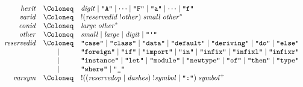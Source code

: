 \begin{align*}
\begin{array}{rcl}
    \\
    \mathit{hexit}
    & \Coloneq & \mathit{digit}
    \mid \text{\texttt{\textquotedbl A\textquotedbl}} \mid \cdots \mid \text{\texttt{\textquotedbl F\textquotedbl}}
    \mid \text{\texttt{\textquotedbl a\textquotedbl}} \mid \cdots \mid \text{\texttt{\textquotedbl f\textquotedbl}}
    \\
    \mathit{varid}
    & \Coloneq & ! (\mathit{reservedid}\; !\mathit{other})\; \mathit{small}\; \mathit{other}^*
    \\
    \mathit{conid}
    & \Coloneq & \mathit{large}\; \mathit{other}^*
    \\
    \mathit{other}
    & \Coloneq & \mathit{small}
    \mid \mathit{large}
    \mid \mathit{digit}
    \mid \text{\texttt{\textquotedbl\textquotesingle\textquotedbl}}
    \\
    \mathit{reservedid}
    & \Coloneq & \text{\texttt{\textquotedbl case\textquotedbl}}
    \mid \text{\texttt{\textquotedbl class\textquotedbl}}
    \mid \text{\texttt{\textquotedbl data\textquotedbl}}
    \mid \text{\texttt{\textquotedbl default\textquotedbl}}
    \mid \text{\texttt{\textquotedbl deriving\textquotedbl}}
    \mid \text{\texttt{\textquotedbl do\textquotedbl}}
    \mid \text{\texttt{\textquotedbl else\textquotedbl}}
    \\
    & \mid & \text{\texttt{\textquotedbl foreign\textquotedbl}}
    \mid \text{\texttt{\textquotedbl if\textquotedbl}}
    \mid \text{\texttt{\textquotedbl import\textquotedbl}}
    \mid \text{\texttt{\textquotedbl in\textquotedbl}}
    \mid \text{\texttt{\textquotedbl infix\textquotedbl}}
    \mid \text{\texttt{\textquotedbl infixl\textquotedbl}}
    \mid \text{\texttt{\textquotedbl infixr\textquotedbl}}
    \\
    & \mid & \text{\texttt{\textquotedbl instance\textquotedbl}}
    \mid \text{\texttt{\textquotedbl let\textquotedbl}}
    \mid \text{\texttt{\textquotedbl module\textquotedbl}}
    \mid \text{\texttt{\textquotedbl newtype\textquotedbl}}
    \mid \text{\texttt{\textquotedbl of\textquotedbl}}
    \mid \text{\texttt{\textquotedbl then\textquotedbl}}
    \mid \text{\texttt{\textquotedbl type\textquotedbl}}
    \\
    & \mid & \text{\texttt{\textquotedbl where\textquotedbl}}
    \mid \text{\texttt{\textquotedbl\textunderscore\textquotedbl}}
    \\
    \mathit{varsym}
    & \Coloneq & {!} ((\mathit{reservedop} \mid \mathit{dashes})\; !\mathit{symbol} \mid \text{\texttt{\textquotedbl :\textquotedbl}})\; \mathit{symbol}^+

\end{array}
\end{align*}
